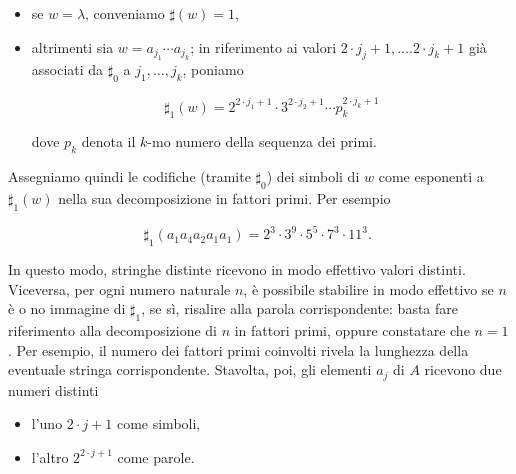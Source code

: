 \begin{enumerate}
          \begin{itemize}
              \item se $w=\lambda$, conveniamo $\sharp(w)=1$,
              \item altrimenti sia $w=a_{j_1} \cdots a_{j_k}$; in riferimento ai valori
                    $2 \cdot j_j+1, \ldots .2 \cdot j_k+1$ già associati da $\sharp_0$
                    a $j_1, \ldots, j_k$, poniamo

                    $$
                        \sharp_1(w)=2^{2 \cdot j_1+1} \cdot 3^{2 \cdot j_2+1} \cdots p_k^{2 \cdot j_k+1}
                    $$

                    dove $p_k$ denota il $k$-mo numero della sequenza dei primi.
          \end{itemize}

          Assegniamo quindi le codifiche (tramite $\sharp_0$) dei simboli di $w$
          come esponenti a $\sharp_1(w)$ nella sua decomposizione in fattori primi.
          Per esempio

          $$
              \sharp_1\left(a_1 a_4 a_2 a_1 a_1\right)=2^3 \cdot 3^9 \cdot 5^5 \cdot 7^3 \cdot 11^3 \text {. }
          $$

          In questo modo, stringhe distinte ricevono in modo effettivo valori
          distinti. Viceversa, per ogni numero naturale $n$, è possibile stabilire
          in modo effettivo se $n$ è o no immagine di $\sharp_1$, se sì, risalire
          alla parola corrispondente: basta fare riferimento alla decomposizione di
          $n$ in fattori primi, oppure constatare che $n=1$. Per esempio, il numero
          dei fattori primi coinvolti rivela la lunghezza della eventuale stringa
          corrispondente. Stavolta, poi, gli elementi $a_j$ di $A$ ricevono due
          numeri distinti

          \begin{itemize}
              \item l'uno $2 \cdot j+1$ come simboli,
              \item l'altro $2^{2 \cdot j+1}$ come parole.
          \end{itemize}


\end{enumerate}
